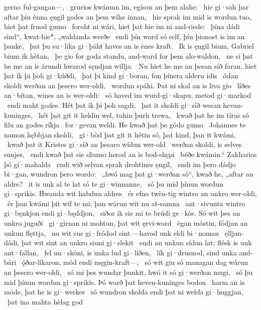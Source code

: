 gerno ful-gangan—, \hld\ grurios kwámun im,
egison an þem alahe: \hld\ hie gi·sah þar aftar þiu ènna ęngil godes
an þem wíhe innan, \hld\ hie sprak im mid is wordun tuo,
hiet þat fruod gumo \hld\ foroht ni wári,
hiet þat hie im ni and-riede: \hld\ þína dádi sind“, kwat-hie*,
„waldanda werðe \hld\ endi þín word só self,
þín þionost is im an þanke, \hld\ þat þu su·lika gi·þáht haves
an is ènes kraft. \hld\ Ik is ęngil bium,
Gabriel bium ik hètan, \hld\ þe gio for goda standu,
and-ward for þem alo-waldon, \hld\ ne sí þat he me an is árundi hwarod
sęndjan willja. \hld\ Nu hiet he me an þesan síð faran,
hiet þat ik þi þoh gi·kúðdi, \hld\ þat þi kind gi·boran,
fon þínera alderu idis \hld\ ódan skoldi
werðan an þesero wer-oldi, \hld\ wordun spáhi.
Þat ni skal an is liva gio \hld\ líðes an·bítan,
wínes an is wer-oldi: \hld\ só haved im wurd-gi·skapu,
metod gi·markod \hld\ endi maht godes.
Hét þat ik þi þoh sagdi, \hld\ þat it skoldi gi·síð wesan
hevan-kuninges, \hld\ hét þat git it heldin wel,
tuhin þurh trewa, \hld\ kwað þat he im tíras só filu
an godes ríkja \hld\ for·gevan weldi.
He kwað þat þe gódo gumo \hld\ Johannes te namon
hębbjan skoldi, \hld\ gi·bòd þat git it hétin só,
þat kind, þan it kwámi, \hld\ kwað þat it Kristes gi·síð
an þesaro wídun wer-old \hld\ werðan skoldi,
is selves sunjes, \hld\ endi kwað þat sie sliumo herod
an is bod-skępi \hld\ béðe kwámin.“
Zakharias þó gi·mahalda \hld\ endi wið selvan sprak
drohtines ęngil, \hld\ endi im þero dádjo bi·gan,
wundron þero wordo: \hld\ „hwó mag þat gi·werðan só“, kwað he,
„aftar an aldre? \hld\ it is unk al te lat
só te gi·winnanne, \hld\ só þu mid þínun wordun gi·sprikis.
Hwanda wit habdun aldres \hld\ ér efno twèn-tig
wintro an unkro wer-oldi, \hld\ ér þan kwámi þit wíf te mi;
þan wárun wit nu at-samna \hld\ ant·sivunta wintro
gi·bęnkjon endi gi·będdjon, \hld\ siðor ik sie mi te brúdi ge·kòs.
Só wit þes an unkro juguði \hld\ gi·girnan ni mohtun,
þat wit ęrvi-ward \hld\ ègan móstin,
fódjan an unkun flęttja, \hld\ nu wit sus gi·fródod sint
—havad unk eldi bi·noman \hld\ ęlljan-dádi,
þat wit sint an unkro siuni gi·slekit \hld\ endi an unkun sídun lat;
flésk is unk ant·fallan, \hld\ fel un·skóni,
is unka lud gi·liðen, \hld\ lík gi·drusnod,
sind unka and-bári \hld\ ǫ́ðar-líkaron,
mód endi męgin-kraft—, \hld\ só wit giu só managan dag
wárun an þesero wer-oldi, \hld\ só mi þes wundạr þunkit,
hwó it só gi·werðan mugi, \hld\ só þu mid þínun wordun gi·sprikis.
Þó warð þat heven-kuninges bodon \hld\ harm an is móde,%
þat he is gi·werkes \hld\ só wundron skolda
endi þat ni welda gi·huggjan, \hld\ þat ina mahta hèlag god
